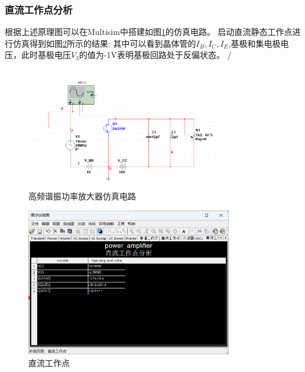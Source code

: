 \documentclass[UTF8]{ctexart}
\begin{document}
\subsubsection{直流工作点分析}
根据上述原理图可以在Multisim中搭建如图\ref{img:2}的仿真电路。
启动直流静态工作点进行仿真得到如图\ref{img:3}所示的结果:
其中可以看到晶体管的$I_B,I_C,I_E$,基极和集电极电压，此时基极电压$V_3$的值为-1V表明基极回路处于反偏状态。
/\begin{figure}[htbp]
    \centering
    \includegraphics[width=0.8\textwidth]{2.png}
    \caption{高频谐振功率放大器仿真电路}
    \label{img:2}
\end{figure}
\begin{figure}[htbp]
    \centering
    \includegraphics[width=0.8\textwidth]{3.png}
    \caption{直流工作点}
    \label{img:3}
\end{figure}
\end{document}
